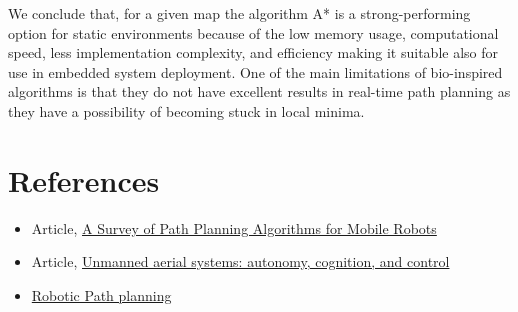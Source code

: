 \documentclass[11pt]{article}
\begin{document}
We conclude that, for a given map the algorithm A* is a strong-performing option
for static environments because of the low memory usage, computational speed, less
implementation complexity, and efficiency making it suitable also for use in embedded
system deployment. One of the main limitations of bio-inspired algorithms is that they do
not have excellent results in real-time path planning as they have a possibility of becoming
stuck in local minima.

\section{References}
\begin{itemize}
\item Article,
\href{https://www.semanticscholar.org/paper/A-Survey-of-Path-Planning-Algorithms-for-Mobile-Karur-Sharma/9c07679d2da571ac6b9a051f229da4272817873d}{A Survey of Path Planning Algorithms for Mobile Robots}
\item Article,
\href{https://www.sciencedirect.com/science/article/abs/pii/B9780128202760000108}{Unmanned aerial systems: autonomy, cognition, and control}
\item \href{https://fab.cba.mit.edu/classes/865.21/topics/path_planning/robotic.html#:~:text=Machine%20learning%20methods%20are%20the%20latest%20development%20for,Q-learning%20algorithms%20provide%20a%20model%20free%20learning%20environment.}{Robotic Path planning}
\end{itemize}
\end{document}
